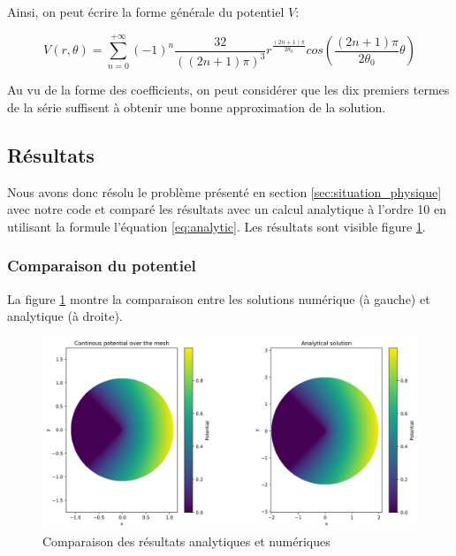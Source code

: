 \documentclass{article}
\begin{document}
Ainsi, on peut écrire la forme générale du potentiel $V$:

\begin{equation}
    V(r, \theta) = \sum_{n=0}^{+\infty}
    \left(-1\right)^n \frac{32}{
        \left((2n+1)\pi\right)^3}
    r^{\frac{(2n+1)\pi}{2 \theta_0}}
    cos\left(\frac{(2n+1)\pi}{2\theta_0}\theta\right)
    \label{eq:analytic}
\end{equation}

Au vu de la forme des coefficients, on peut considérer que 
les dix premiers termes de la série suffisent à obtenir une
bonne approximation de la solution.

\newpage

\subsection{Résultats}
\label{sec:results}

Nous avons donc résolu le problème présenté en section
\ref{sec:situation_physique} avec notre code et comparé
les résultats avec un calcul analytique à l'ordre 10
en utilisant la formule l'équation \ref{eq:analytic}.
Les résultats sont visible figure \ref{fig:analytic_vs_numeric}.

\subsubsection{Comparaison du potentiel}

La figure \ref{fig:analytic_vs_numeric} montre la comparaison
entre les solutions numérique (à gauche) et analytique (à droite).

\begin{figure}[!h]
    \centering
    \includegraphics[scale=0.5]{img/comparison.png}
    \caption{Comparaison des résultats analytiques et numériques}
    \label{fig:analytic_vs_numeric}
\end{figure}
\end{document}
